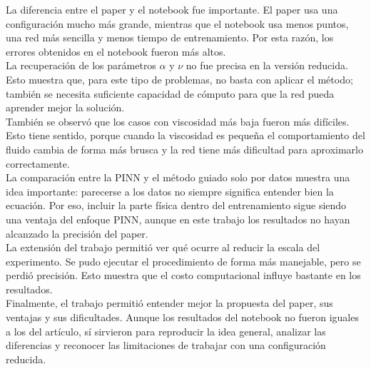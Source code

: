 \documentclass[10pt,letterpaper,twocolumn]{article}
\begin{document}
La diferencia entre el paper y el notebook fue importante. El paper usa una configuración mucho más grande, mientras que el notebook usa menos puntos, una red más sencilla y menos tiempo de entrenamiento. Por esta razón, los errores obtenidos en el notebook fueron más altos.\\

La recuperación de los parámetros $\alpha$ y $\nu$ no fue precisa en la versión reducida. Esto muestra que, para este tipo de problemas, no basta con aplicar el método; también se necesita suficiente capacidad de cómputo para que la red pueda aprender mejor la solución.\\

También se observó que los casos con viscosidad más baja fueron más difíciles. Esto tiene sentido, porque cuando la viscosidad es pequeña el comportamiento del fluido cambia de forma más brusca y la red tiene más dificultad para aproximarlo correctamente.\\

La comparación entre la PINN y el método guiado solo por datos muestra una idea importante: parecerse a los datos no siempre significa entender bien la ecuación. Por eso, incluir la parte física dentro del entrenamiento sigue siendo una ventaja del enfoque PINN, aunque en este trabajo los resultados no hayan alcanzado la precisión del paper.\\

La extensión del trabajo permitió ver qué ocurre al reducir la escala del experimento. Se pudo ejecutar el procedimiento de forma más manejable, pero se perdió precisión. Esto muestra que el costo computacional influye bastante en los resultados.\\

Finalmente, el trabajo permitió entender mejor la propuesta del paper, sus ventajas y sus dificultades. Aunque los resultados del notebook no fueron iguales a los del artículo, sí sirvieron para reproducir la idea general, analizar las diferencias y reconocer las limitaciones de trabajar con una configuración reducida.


\end{document}
